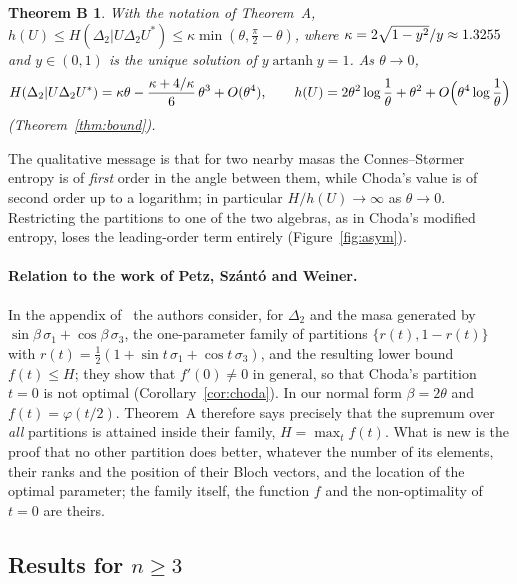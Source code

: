 \documentclass[11pt]{article}
\DeclareMathOperator{\artanh}{artanh}
\theoremstyle{plain}
\newtheorem*{thmB}{Theorem B}
\theoremstyle{definition}
\theoremstyle{remark}
\begin{document}
\begin{thmB}
With the notation of Theorem~A, $h(U)\le H(\Delta_2|U\Delta_2U^*)\le\kappa\min(\theta,\frac\pi2-\theta)$, where
$\kappa=2\sqrt{1-y^2}/y\approx1.3255$ and $y\in(0,1)$ is the unique solution of $y\artanh y=1$. As $\theta\to0$,
\[
  H(\Delta_2|U\Delta_2U^*)=\kappa\theta-\frac{\kappa+4/\kappa}{6}\,\theta^3+O(\theta^4),\qquad
  h(U)=2\theta^2\log\frac1\theta+\theta^2+O\Bigl(\theta^4\log\frac1\theta\Bigr)
\]
(Theorem~\ref{thm:bound}).
\end{thmB}

The qualitative message is that for two nearby masas the Connes--St{\o}rmer entropy is of \emph{first} order in the angle
between them, while Choda's value is of second order up to a logarithm; in particular $H/h(U)\to\infty$ as $\theta\to0$.
Restricting the partitions to one of the two algebras, as in Choda's modified entropy, loses the leading-order term
entirely (Figure~\ref{fig:asym}).

\paragraph{Relation to the work of Petz, Sz\'ant\'o and Weiner.} In the appendix of~\cite{petz2009} the authors consider,
for $\Delta_2$ and the masa generated by $\sin\beta\,\sigma_1+\cos\beta\,\sigma_3$, the one-parameter family of partitions
$\{r(t),1-r(t)\}$ with $r(t)=\frac12(1+\sin t\,\sigma_1+\cos t\,\sigma_3)$, and the resulting lower bound $f(t)\le H$; they
show that $f'(0)\ne0$ in general, so that Choda's partition $t=0$ is not optimal (Corollary~\ref{cor:choda}). In our
normal form $\beta=2\theta$ and $f(t)=\varphi(t/2)$. Theorem~A therefore says precisely that the supremum over \emph{all}
partitions is attained inside their family, $H=\max_tf(t)$. What is new is the proof that no other partition does
better, whatever the number of its elements, their ranks and the position of their Bloch vectors, and the location of
the optimal parameter; the family itself, the function $f$ and the non-optimality of $t=0$ are theirs.

\subsection{Results for \texorpdfstring{$n\ge3$}{n>=3}}
\end{document}
